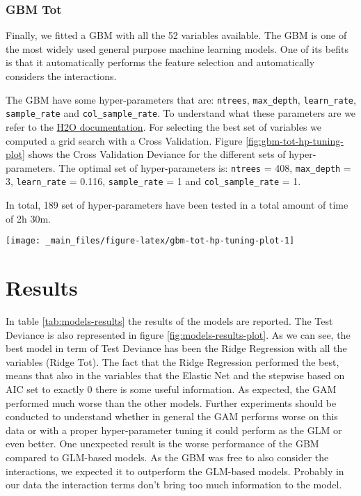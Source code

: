 \documentclass[a4paper, twoside, openright, 12pt]{report}
\let\origfigure\figure
\let\endorigfigure\endfigure
\renewenvironment{figure}[1][2] {
  \expandafter\origfigure\expandafter[!hbtp]
} {
  \endorigfigure
}
\theoremstyle{definition}
\theoremstyle{definition}
\theoremstyle{definition}
\theoremstyle{remark}
\begin{document}
\hypertarget{gbm-tot}{%
\subsubsection{GBM Tot}\label{gbm-tot}}

Finally, we fitted a GBM with all the 52 variables available. The GBM is one of the most widely used general purpose machine learning models. One of its befits is that it automatically performs the feature selection and automatically considers the interactions.

The GBM have some hyper-parameters that are: \texttt{ntrees}, \texttt{max\_depth}, \texttt{learn\_rate}, \texttt{sample\_rate} and \texttt{col\_sample\_rate}. To understand what these parameters are we refer to the \href{http://docs.h2o.ai/h2o/latest-stable/h2o-docs/data-science/gbm.html}{H2O documentation}. For selecting the best set of variables we computed a grid search with a Cross Validation. Figure \ref{fig:gbm-tot-hp-tuning-plot} shows the Cross Validation Deviance for the different sets of hyper-parameters. The optimal set of hyper-parameters is:
\texttt{ntrees} = 408,
\texttt{max\_depth} = 3,
\texttt{learn\_rate} = 0.116,
\texttt{sample\_rate} = 1 and
\texttt{col\_sample\_rate} = 1.

In total, 189 set of hyper-parameters have been tested in a total amount of time of 2h 30m.





\begin{figure}[!hbtp]

{\centering \texttt{[image: \_main\_files/figure-latex/gbm-tot-hp-tuning-plot-1]} 

}

\caption[GBM Tot hyper-parameter tuning.]{GBM Tot hyper-parameter tuning.}\label{fig:gbm-tot-hp-tuning-plot}
\end{figure}

\hypertarget{chap:results}{%
\section{Results}\label{chap:results}}

In table \ref{tab:models-results} the results of the models are reported. The Test Deviance is also represented in figure \ref{fig:models-results-plot}. As we can see, the best model in term of Test Deviance has been the Ridge Regression with all the variables (Ridge Tot). The fact that the Ridge Regression performed the best, means that also in the variables that the Elastic Net and the stepwise based on AIC set to exactly 0 there is some useful information. As expected, the GAM performed much worse than the other models. Further experiments should be conducted to understand whether in general the GAM performs worse on this data or with a proper hyper-parameter tuning it could perform as the GLM or even better. One unexpected result is the worse performance of the GBM compared to GLM-based models. As the GBM was free to also consider the interactions, we expected it to outperform the GLM-based models. Probably in our data the interaction terms don't bring too much information to the model.
\end{document}
